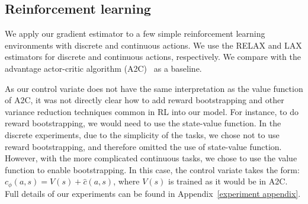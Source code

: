 \documentclass{article}
\newcommand{\LAX}{{\textnormal{LAX}}}
\newcommand{\RELAX}{{\textnormal{RELAX}}}
\begin{document}




\subsection{Reinforcement learning}
\label{experiments section}

We apply our gradient estimator to a few simple reinforcement learning environments with discrete and continuous actions.
We use the \RELAX{} and \LAX{} estimators for discrete and continuous actions, respectively. We compare with the advantage actor-critic algorithm (A2C)~\citep{sutton2000policy} as a baseline. 

As our control variate does not have the same interpretation as the value function of A2C, it was not directly clear how to add reward bootstrapping and other variance reduction techniques common in RL into our model. For instance, to do reward bootstrapping, we would need to use the state-value function. In the discrete experiments, due to the simplicity of the tasks, we chose not to use reward bootstrapping, and therefore omitted the use of state-value function. However, with the more complicated continuous tasks, we chose to use the value function to enable bootstrapping. In this case, the control variate takes the form: $c_\phi(a,s) = V(s) + \hat{c}(a,s)$, where $V(s)$ is trained as it would be in A2C. Full details of our experiments can be found in Appendix~\ref{experiment appendix}.


\end{document}

